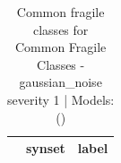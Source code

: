 \begin{table}
\caption{Common fragile classes for Common Fragile Classes - gaussian_noise severity 1 | Models: ()}
\label{tab:Common Fragile Classes - gaussian_noise severity 1_d41d8cd9}
\begin{tabular}{cll}
\toprule
 & synset & label \\
\midrule
\bottomrule
\end{tabular}
\end{table}
